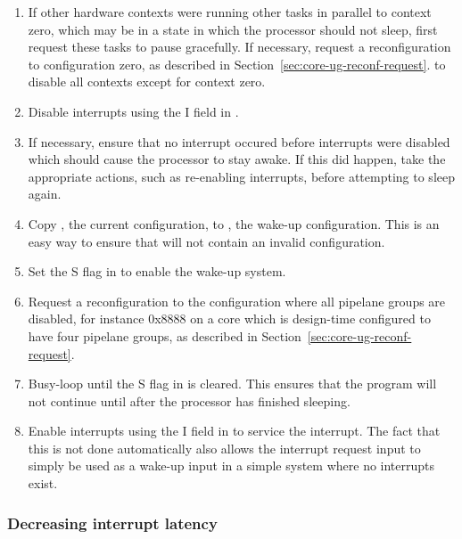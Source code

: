 \begin{enumerate}

\item If other hardware contexts were running other tasks in parallel to
context zero, which may be in a state in which the processor should not sleep,
first request these tasks to pause gracefully. If necessary, request a
reconfiguration to configuration zero, as described in 
Section~\ref{sec:core-ug-reconf-request}. to disable all contexts except for 
context zero.

\item Disable interrupts using the I field in .

\item If necessary, ensure that no interrupt occured before interrupts were
disabled which should cause the processor to stay awake. If this did happen,
take the appropriate actions, such as re-enabling interrupts, before attempting
to sleep again.

\item Copy , the current configuration, to , the wake-up
configuration. This is an easy way to ensure that  will not contain
an invalid configuration.

\item Set the S flag in  to enable the wake-up system.

\item Request a reconfiguration to the configuration where all pipelane groups 
are disabled, for instance 0x8888 on a core which is design-time configured to 
have four pipelane groups, as described in
Section~\ref{sec:core-ug-reconf-request}.

\item Busy-loop until the S flag in  is cleared. This ensures that
the program will not continue until after the processor has finished sleeping.

\item Enable interrupts using the I field in  to service the
interrupt. The fact that this is not done automatically also allows the
interrupt request input to simply be used as a wake-up input in a simple system
where no interrupts exist.

\end{enumerate}

\subsubsection{Decreasing interrupt latency}
\label{sec:core-ug-reconf-saw-latency}

